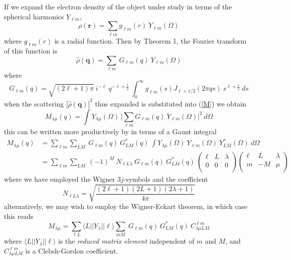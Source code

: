 \documentclass[aps,prl,preprint,groupedaddress]{revtex4-1}
\def\*#1{\mathbf{#1}}
\begin{document}
If we expand the electron density of the object under study in terms of the spherical harmonics $Y_{\ell m}$,
\[
\rho( \*r ) = \sum_{\ell m} g_{\ell m} (r) \> Y_{\ell m}(\Omega)
\]
where $g_{\ell m} (r)$ is a radial function. Then by Theorem 1, the Fourier transform of this function is
\[
\hat{\rho} (\*q) = \sum_{\ell m} \> G_{\ell m} (q) \> Y_{\ell m}(\Omega)
\]
where
\[
G_{\ell m} (q) = \sqrt{ (2 \ell + 1) \pi} \> i^{-\ell} \> q^{- \ell + \frac{1}{2} } \> \int_0^{\infty} g_{\ell m} (s) J_{\ell + 1/2} (2 \pi q s) \> s^{\ell + \frac{1}{2}} \> ds
\]
when the scattering $| \hat{\rho}(\*q) |^2$ thus expanded is substituted into (\ref{M}) we obtain
\[
M_{\lambda \mu}(q) = \int Y_{\lambda \mu} (\Omega) \> \Big|
\sum_{\ell m} G_{\ell m} (q) \> Y_{\ell m}(\Omega)
\Big|^2 \> d\Omega
\]
this can be written more productively by in terms of a Gaunt integral
\begin{align*}
M_{\lambda \mu}(q) &= \sum_{\ell m} \sum_{L M} \> G_{\ell m}(q) \> G_{L M}^* (q) \>
\int Y_{\lambda \mu} (\Omega) \> Y_{\ell m} (\Omega) \> Y_{LM}^* (\Omega) \> d\Omega \\
&= \sum_{\ell m} \sum_{L M} \> (-1)^M \> N_{\ell L \lambda} \> G_{\ell m}(q) \> G_{L M}^* (q) \>
\left( \begin{array}{ccc}
\ell & L & \lambda \\
0 & 0 & 0 \\
\end{array} \right)
\left( \begin{array}{ccc}
\ell & L & \lambda \\
m & -M & \mu \\
\end{array} \right)
\end{align*}
where we have employed the Wigner $3j$-symbols and the coefficient
\[
N_{\ell L \lambda} = \sqrt{ \frac{(2 \ell + 1)(2 L + 1)(2 \lambda + 1)}{4 \pi} }
\]
alternatively, we may wish to employ the Wigner-Eckart theorem, in which case this reads
\[
M_{\lambda \mu} = \sum_{\ell L} \langle L || Y_\lambda || \ell \rangle 
\sum_{m M} \> G_{\ell m}(q) \> G_{L M}^* (q) \>  C^{\ell m}_{\lambda \mu LM}
\]
where $\langle L || Y_\lambda || \ell \rangle$ is the \emph{reduced matrix element} independent of $m$ and $M$, and $C^{\ell m}_{\lambda \mu LM}$ is a Clebsh-Gordon coefficient.
\end{document}
